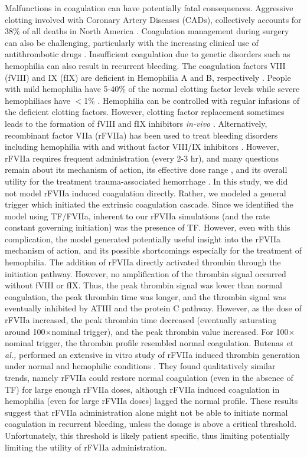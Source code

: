 \documentclass[12pt]{article}
\begin{document}
Malfunctions in coagulation can have potentially fatal consequences.
Aggressive clotting involved with Coronary Artery Diseases (CADs), collectively accounts for 38\% of all deaths in North America \cite{HANSSON2005}.
Coagulation management during surgery can also be challenging, particularly with the increasing clinical use of antithrombotic drugs \cite{Tanaka:2009wo}.   
Insufficient coagulation due to genetic disorders such as hemophilia can also result in recurrent bleeding. 
The coagulation factors VIII (fVIII) and IX (fIX) are deficient in Hemophilia A and B, respectively \cite{COOPER1994,MANNUCCI2001,MITCHELL2008}.
People with mild hemophilia have 5-40\% of the normal clotting factor levels while severe hemophiliacs have $<$1\% \cite{MITCHELL2008}.
Hemophilia can be controlled with regular infusions of the deficient clotting factors. 
However, clotting factor replacement sometimes leads to the formation of fVIII and fIX inhibitors \emph{in-vivo} \cite{TOMOKIYO2003}.
Alternatively, recombinant factor VIIa (rFVIIa) has been used to treat bleeding disorders \cite{Hedner:2008rm,Talbot:2009kk} including
hemophilia with and without factor VIII/IX inhibitors \cite{Shapiro:2008px}.
However, rFVIIa requires frequent administration (every 2-3 hr), and many questions remain about its mechanism of action, 
its effective dose range \cite{TOMOKIYO2003}, and its overall utility for the treatment trauma-associated hemorrhage \cite{Duchesne:2008hw}. 
In this study, we did not model rFVIIa induced coagulation directly. 
Rather, we modeled a general trigger which initiated the extrinsic coagulation cascade. 
Since we identified the model using TF/FVIIa, inherent to our rFVIIa simulations (and the rate constant governing initiation) 
was the presence of TF. However, even with this complication, 
the model generated potentially useful insight into the rFVIIa mechanism of action, and its possible shortcomings especially for the treatment of hemophilia. 
The addition of rFVIIa directly activated thrombin through the initiation pathway. 
However, no amplification of the thrombin signal occurred without fVIII or fIX. 
Thus, the peak thrombin signal was lower than normal coagulation, the peak thrombin time was longer, and the thrombin signal was eventually inhibited by ATIII and the protein C pathway.
However, as the dose of rFVIIa increased, the peak thrombin time decreased (eventually saturating around 100$\times$nominal trigger), and the peak thrombin value increased.
For 100$\times$nominal trigger, the thrombin profile resembled normal coagulation.
Butenas \emph{et al.,} performed an extensive in vitro study of rFVIIa induced thrombin generation under normal and hemophilic conditions \citep{Butenas:2002ab}.
They found qualitatively similar trends, namely rFVIIa could restore normal coagulation (even in the absence of TF) for large enough rFVIIa doses, although rFVIIa induced coagulation 
in hemophilia (even for large rFVIIa doses) lagged the normal profile. 
These results suggest that rFVIIa administration alone
might not be able to initiate normal coagulation in recurrent bleeding, unless the dosage is above a critical threshold. 
Unfortunately, this threshold is likely patient specific, thus limiting potentially limiting the utility of rFVIIa administration.  
\end{document}
